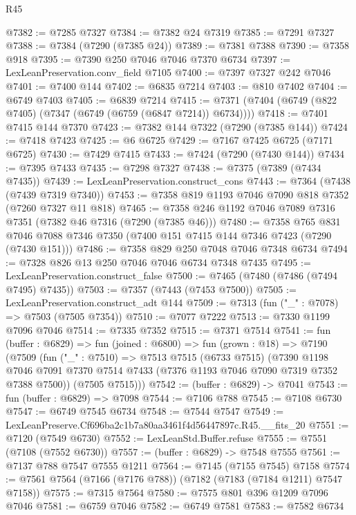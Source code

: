 \begin{lexlean}{R45}
\begin{coremodule}
{@7382 := @7285 @7327
@7384 := @7382 @24 @7319
@7385 := @7291 @7327
@7388 := @7384 (@7290 (@7385 @24))
@7389 := @7381 @7388
@7390 := @7358 @918
@7395 := @7390 @250 @7046 @7046 @7370 @6734
@7397 := LexLeanPreservation.conv_field @7105
@7400 := @7397 @7327 @242 @7046
@7401 := @7400 @144
@7402 := @6835 @7214
@7403 := @810 @7402
@7404 := @6749 @7403
@7405 := @6839 @7214
@7415 := @7371 (@7404 (@6749 (@822 @7405) (@7347 (@6749 (@6759 (@6847 @7214)) @6734))))
@7418 := @7401 @7415 @144 @7370
@7423 := @7382 @144 @7322 (@7290 (@7385 @144))
@7424 := @7418 @7423
@7425 := @6 @6725
@7429 := @7167 @7425 @6725 (@7171 @6725)
@7430 := @7429 @7415
@7433 := @7424 (@7290 (@7430 @144))
@7434 := @7395 @7433
@7435 := @7298 @7327
@7438 := @7375 (@7389 (@7434 @7435))
@7439 := LexLeanPreservation.construct_cons
@7443 := @7364 (@7438 (@7439 @7319 @7340))
@7453 := @7358 @819 @1193 @7046 @7090 @818 @7352 (@7260 @7327 @11 @818)
@7465 := @7358 @246 @1192 @7046 @7089 @7316 @7351 (@7382 @46 @7316 (@7290 (@7385 @46)))
@7480 := @7358
    @765
    @831
    @7046
    @7088
    @7346
    @7350
    (@7400 @151 @7415 @144 @7346 @7423 (@7290 (@7430 @151)))
@7486 := @7358 @829 @250 @7048 @7046 @7348 @6734
@7494 := @7328 @826 @13 @250 @7046 @7046 @6734 @7348 @7435
@7495 := LexLeanPreservation.construct_false
@7500 := @7465 (@7480 (@7486 (@7494 @7495) @7435))
@7503 := @7357 (@7443 (@7453 @7500))
@7505 := LexLeanPreservation.construct_adt @144
@7509 := @7313 (fun ("_" : @7078) => @7503 (@7505 @7354))
@7510 := @7077 @7222
@7513 := @7330 @1199 @7096 @7046
@7514 := @7335 @7352
@7515 := @7371 @7514
@7541 := fun (buffer : @6829) =>
  fun (joined : @6800) =>
  fun (grown : @18) =>
  @7190
    (@7509
      (fun ("_" : @7510) =>
      @7513
        @7515
        (@6733 @7515)
        (@7390
          @1198
          @7046
          @7091
          @7370
          @7514
          @7433
          (@7376 @1193 @7046 @7090 @7319 @7352 @7388 @7500))
        (@7505 @7515)))
@7542 := (buffer : @6829) -> @7041
@7543 := fun (buffer : @6829) => @7098
@7544 := @7106 @788
@7545 := @7108 @6730
@7547 := @6749 @7545 @6734
@7548 := @7544 @7547
@7549 := LexLeanPreserve.Cf696ba2c1b7a80aa3461f4d56447897c.R45.__fits_20
@7551 := @7120 (@7549 @6730)
@7552 := LexLeanStd.Buffer.refuse
@7555 := @7551 (@7108 (@7552 @6730))
@7557 := (buffer : @6829) -> @7548 @7555
@7561 := @7137 @788 @7547 @7555 @1211
@7564 := @7145 (@7155 @7545) @7158
@7574 := @7561 @7564 (@7166 (@7176 @788)) (@7182 (@7183 (@7184 @1211) @7547 @7158))
@7575 := @7315 @7564
@7580 := @7575 @801 @396 @1209 @7096 @7046
@7581 := @6759 @7046
@7582 := @6749 @7581
@7583 := @7582 @6734
}
\end{coremodule}
\end{lexlean}

